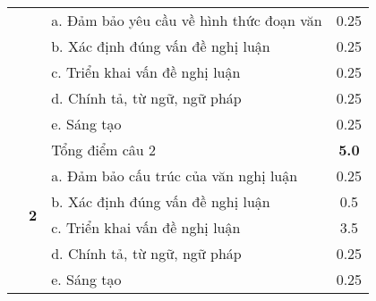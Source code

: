 \documentclass{article}
\begin{document}
{\begin{tabular}{|c|c|l|c|}
		&                             & a. Đảm bảo yêu cầu về hình thức đoạn văn                                                                                                                                           & 0.25 \\ \cline{3-4} 
		&                             & b. Xác định đúng vấn đề nghị luận                                                                                                                                                  & 0.25 \\ \cline{3-4} 
		&                             & c. Triển khai vấn đề nghị luận                                                                                                                                                     & 0.25 \\ \cline{3-4} 
		&                             & d. Chính tả, từ ngữ, ngữ pháp                                                                                                                                                      & 0.25 \\ \cline{3-4} 
		&                             & e. Sáng tạo                                                                                                                                                                        & 0.25 \\ \cline{2-4} 
		& \multirow{6}{*}{\textbf{2}} & Tổng điểm câu 2                                                                                                                                                                      & \textbf{5.0}              \\ \cline{3-4} 
		&                             & a. Đảm bảo cấu trúc của văn nghị luận                                                                                                                                              & 0.25                      \\ \cline{3-4} 
		&                             & b. Xác định đúng vấn đề nghị luận                                                                                                                                                  & 0.5                       \\ \cline{3-4} 
		&                             & c. Triển khai vấn đề nghị luận                                                                                                                                                     & 3.5                       \\ \cline{3-4} 
		&                             & d. Chính tả, từ ngữ, ngữ pháp                                                                                                                                                      & 0.25                      \\ \cline{3-4} 
		&                             & e. Sáng tạo                                                                                                                                                                        & 0.25                      \\ \hline
	\end{tabular}
	
}
\end{document}
